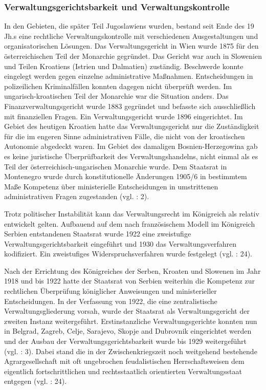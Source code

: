 \subsubsection{Verwaltungsgerichtsbarkeit und Verwaltungskontrolle}

In den Gebieten, die später Teil Jugoslawiens wurden, bestand seit Ende des 19 Jh.s eine rechtliche Verwaltungskontrolle mit verschiedenen Ausgestaltungen und organisatorischen Lösungen. Das Verwaltungsgericht in Wien wurde 1875 für den österreichischen Teil der Monarchie gegründet. Das Gericht war auch in Slowenien und Teilen Kroatiens (Istrien und Dalmatien) zuständig. Beschwerde konnte eingelegt werden gegen einzelne administrative Maßnahmen. Entscheidungen in polizeilichen Kriminalfällen konnten dagegen nicht überprüft werden. Im ungarisch-kroatischen Teil der Monarchie war die Situation anders. Das Finanzverwaltungsgericht wurde 1883 gegründet und befasste sich ausschließlich mit finanziellen Fragen. Ein Verwaltungsgericht wurde 1896 eingerichtet. Im Gebiet des heutigen Kroatien hatte das Verwaltungsgericht nur die Zuständigkeit für die im engeren Sinne administrativen Fälle, die nicht von der kroatischen Autonomie abgedeckt waren. Im Gebiet des damaligen Bosnien-Herzegowina gab es keine juristische Überprüfbarkeit des Verwaltungshandelns, nicht einmal als es Teil der österreichisch-ungarischen Monarchie wurde. Dem Staatsrat in Montenegro wurde durch konstitutionelle Änderungen 1905/6 in bestimmtem Maße Kompetenz über ministerielle Entscheidungen in umstrittenen administrativen Fragen zugestanden (vgl. \cite{kopric} : 2).\par
Trotz politischer Instabilität kann das Verwaltungsrecht im Königreich als relativ entwickelt gelten. Aufbauend auf dem nach französischem Modell im Königreich Serbien entstandenen Staatsrat wurde 1922 eine zweistufige Verwaltungsgerichtsbarkeit eingeführt und 1930 das Verwaltungsverfahren kodifiziert. Ein zweistufiges Widerspruchsverfahren wurde festgelegt (vgl. \cite{lucht} : 24).
\par
Nach der Errichtung des Königreiches der Serben, Kroaten und Slowenen im Jahr 1918 und bis 1922 hatte der Staatsrat von Serbien weiterhin die Kompetenz zur rechtlichen Überprüfung königlicher Anweisungen und ministerieller Entscheidungen. In der Verfassung von 1922, die eine zentralistische Verwaltungsgliederung vorsah, wurde der Staatsrat als Verwaltungsgericht der zweiten Instanz weitergeführt. Erstinstanzliche Verwaltungsgerichte konnten nun in Belgrad, Zagreb, Celje, Sarajevo, Skopje and Dubrovnik eingerichtet werden und der Ausbau der Verwaltungsgerichtsbarkeit wurde bis 1929 weitergeführt (vgl. \cite{kopric} : 3). Dabei stand die in der Zwischenkriegszeit noch weitgehend bestehende Agrargesellschaft mit oft ungebrochen feudalistischen Herrschaftsweisen dem eigentlich fortschrittlichen und rechtsstaatlich orientierten Verwaltungsstaat entgegen (vgl. \cite{lucht} : 24).

